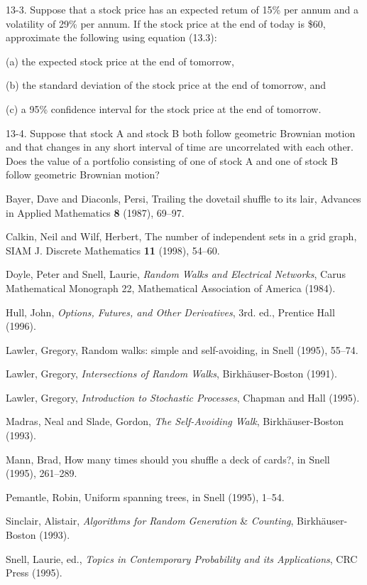\documentclass{stml-l}
\theoremstyle{definition}
\numberwithin{equation}{chapter}
\numberwithin{figure}{chapter}
\numberwithin{figure}{section}
\begin{document}
13-3. Suppose that a stock price has an expected retum of 15\% per
annum and a volatility of 29\% per annum. If the stock price at the
end of today is {\$}60, approximate the following using equation
(13.3):

(a) the expected stock price at the end of tomorrow,

(b) the standard deviation of the stock price at the end of tomorrow, and

(c) a 95\% confidence interval for the stock price at the end of tomorrow.

13-4. Suppose that stock A and stock B both follow geometric
Brownian motion and that changes in any short interval of time are
uncorrelated with each other. Does the value of a portfolio
consisting of one of stock A and one of stock B follow geometric
Brownian motion?

\backmatter


\begin{thebibliography}{99}
 Bayer, Dave and Diaconls, Persi, Trailing the dovetail shuffle to its lair, Advances in Applied Mathematics \textbf{8} (1987), 69--97.

 Calkin, Neil and Wilf, Herbert, The number of independent sets in a grid graph, SIAM J. Discrete Mathematics \textbf{11} (1998), 54--60.

 Doyle, Peter and Snell, Laurie, \emph{Random Walks and Electrical Networks}, Carus Mathematical Monograph 22, Mathematical Association of America (1984).

 Hull, John, \emph{Options, Futures, and Other Derivatives}, 3rd. ed., Prentice Hall (1996).

 Lawler, Gregory, Random walks: simple and self-avoiding, in Snell (1995), 55--74.

 Lawler, Gregory, \emph{Intersections of Random Walks}, Birkh\"{a}user-Boston (1991).

 Lawler, Gregory, \emph{Introduction to Stochastic Processes}, Chapman and Hall (1995).

 Madras, Neal and Slade, Gordon, \emph{The Self-Avoiding Walk}, Birkh\"{a}user-Boston (1993).

 Mann, Brad, How many times should you shuffle a deck of cards?, in Snell (1995), 261--289.

 Pemantle, Robin, Uniform spanning trees, in Snell (1995), 1--54.

 Sinclair, Alistair, \emph{Algorithms for Random Generation} \& \emph{Counting}, Birkh\"{a}user-Boston (1993).

 Snell, Laurie, ed., \emph{Topics in Contemporary Probability and its Applications}, CRC Press (1995).
\end{thebibliography}
\end{document}
